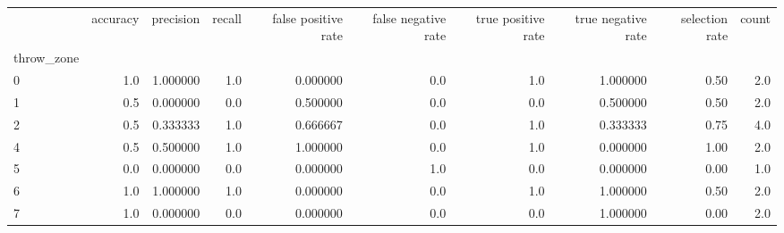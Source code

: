 \begin{tabular}{lrrrrrrrrr}
\toprule
{} &  accuracy &  precision &  recall &  false positive rate &  false negative rate &  true positive rate &  true negative rate &  selection rate &  count \\
throw\_zone &           &            &         &                      &                      &                     &                     &                 &        \\
\midrule
0          &       1.0 &   1.000000 &     1.0 &             0.000000 &                  0.0 &                 1.0 &            1.000000 &            0.50 &    2.0 \\
1          &       0.5 &   0.000000 &     0.0 &             0.500000 &                  0.0 &                 0.0 &            0.500000 &            0.50 &    2.0 \\
2          &       0.5 &   0.333333 &     1.0 &             0.666667 &                  0.0 &                 1.0 &            0.333333 &            0.75 &    4.0 \\
4          &       0.5 &   0.500000 &     1.0 &             1.000000 &                  0.0 &                 1.0 &            0.000000 &            1.00 &    2.0 \\
5          &       0.0 &   0.000000 &     0.0 &             0.000000 &                  1.0 &                 0.0 &            0.000000 &            0.00 &    1.0 \\
6          &       1.0 &   1.000000 &     1.0 &             0.000000 &                  0.0 &                 1.0 &            1.000000 &            0.50 &    2.0 \\
7          &       1.0 &   0.000000 &     0.0 &             0.000000 &                  0.0 &                 0.0 &            1.000000 &            0.00 &    2.0 \\
\bottomrule
\end{tabular}
